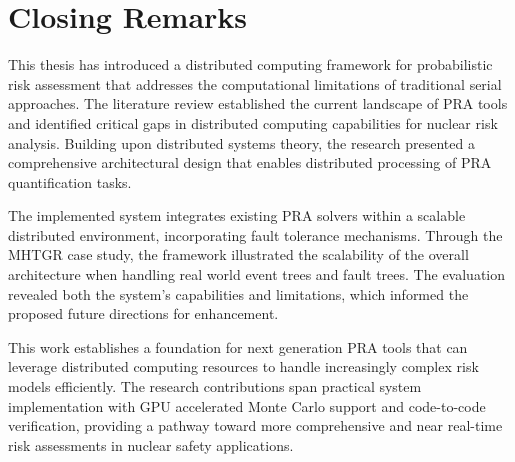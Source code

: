 \section{Closing Remarks}
This thesis has introduced a distributed computing framework for probabilistic risk assessment that addresses the computational limitations of traditional serial approaches. The literature review established the current landscape of PRA tools and identified critical gaps in distributed computing capabilities for nuclear risk analysis. Building upon distributed systems theory, the research presented a comprehensive architectural design that enables distributed processing of PRA quantification tasks.

The implemented system integrates existing PRA solvers within a scalable distributed environment, incorporating fault tolerance mechanisms. Through the MHTGR case study, the framework illustrated the scalability of the overall architecture when handling real world event trees and fault trees. The evaluation revealed both the system’s capabilities and limitations, which informed the proposed future directions for enhancement.

This work establishes a foundation for next generation PRA tools that can leverage distributed computing resources to handle increasingly complex risk models efficiently. The research contributions span practical system implementation with GPU accelerated Monte Carlo support and code-to-code verification, providing a pathway toward more comprehensive and near real-time risk assessments in nuclear safety applications.

